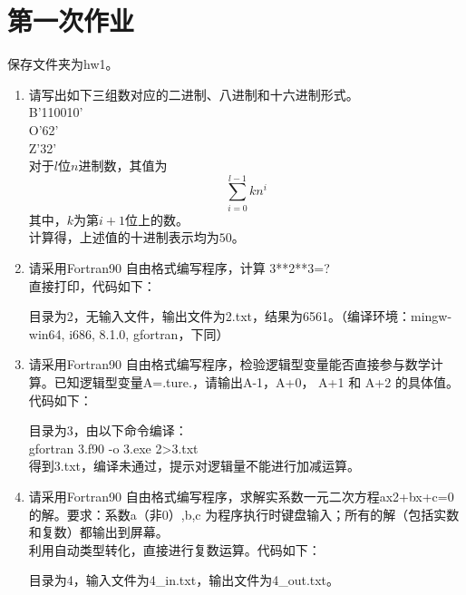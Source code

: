 \documentclass{ctexart}
\begin{document}
\section{第一次作业}
    
    保存文件夹为hw1。

    \begin{enumerate}

        \item
            请写出如下三组数对应的二进制、八进制和十六进制形式。\\
            B'110010'\\
            O'62'\\
            Z'32'\\

            对于$l$位$n$进制数，其值为
            \[\sum_{i=0}^{l-1} kn^i\]
            其中，$k$为第$i+1$位上的数。\\
            计算得，上述值的十进制表示均为$50$。

        \item
            请采用Fortran90 自由格式编写程序，计算 3**2**3=?\\

            直接打印，代码如下：
            

            目录为2，无输入文件，输出文件为2.txt，结果为6561。（编译环境：mingw-win64, i686, 8.1.0, gfortran，下同）

        \item
            请采用Fortran90 自由格式编写程序，检验逻辑型变量能否直接参与数学计算。已知逻辑型变量A=.ture.，请输出A-1，A+0， A+1 和 A+2 的具体值。\\

            代码如下：
            

            目录为3，由以下命令编译：\\gfortran 3.f90 -o 3.exe 2>3.txt\\
            得到3.txt，编译未通过，提示对逻辑量不能进行加减运算。

        \item
            请采用Fortran90 自由格式编写程序，求解实系数一元二次方程ax2+bx+c=0的解。要求：系数a（非0）,b,c 为程序执行时键盘输入；所有的解（包括实数和复数）都输出到屏幕。\\

            利用自动类型转化，直接进行复数运算。代码如下：
            

            目录为4，输入文件为4\_in.txt，输出文件为4\_out.txt。

    \end{enumerate}
\end{document}
